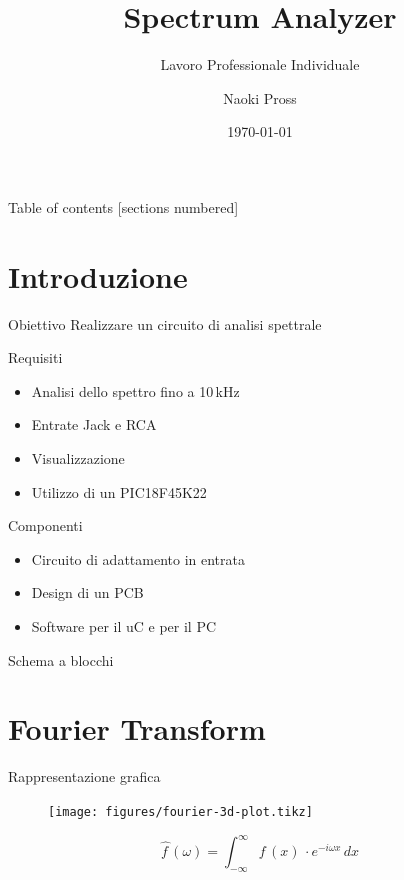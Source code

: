 \documentclass[10pt, xetex]{beamer}
\title{Spectrum Analyzer}
\subtitle{Lavoro Professionale Individuale}
\date{\today}
\author{Naoki Pross}
\institute{SAM Bellinzona}
\newcommand{\dd}[1]{{d}#1}
\begin{document}
\maketitle

\begin{frame}{Table of contents}
    [sections numbered]
    \tableofcontents[hideallsubsections]
\end{frame}

\section{Introduzione}
\begin{frame}{Obiettivo}
    Realizzare un circuito di analisi spettrale
    \begin{block}{Requisiti}
    \begin{itemize}
        \item Analisi dello spettro fino a 10\,kHz
        \item Entrate Jack e RCA
        \item Visualizzazione 
        \item Utilizzo di un PIC18F45K22
    \end{itemize}
    \end{block}
    
    \pause
    \begin{block}{Componenti}
    \begin{itemize}
        \item Circuito di adattamento in entrata
        \item Design di un PCB
        \item Software per il uC e per il PC
    \end{itemize}
    \end{block}
\end{frame}

\begin{frame}{Schema a blocchi}
    \begin{figure} \centering
    \end{figure}
\end{frame}

\section{Fourier Transform}
\begin{frame}{Rappresentazione grafica}
    \begin{figure} \centering
        \texttt{[image: figures/fourier-3d-plot.tikz]}
    \end{figure}
    \[
        \hat{f\,} (\omega) 
        = \int_{-\infty}^\infty f\,(x)\,\cdot e^{-i\omega x}\,\dd{x}
    \]
\end{frame}
\end{document}
